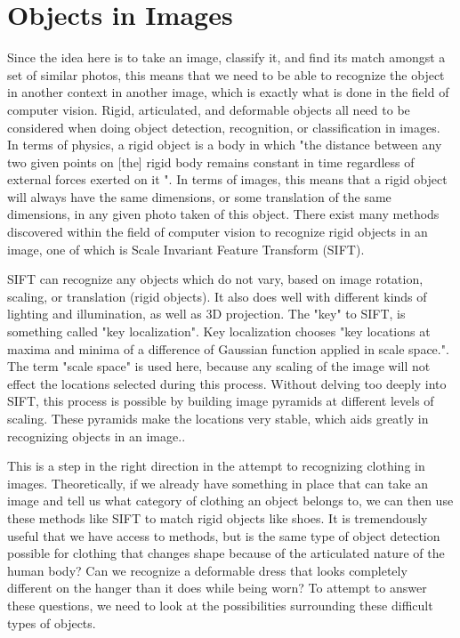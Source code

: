 \documentclass[12pt]{report} %
\begin{document}
\section{Objects in Images}

	Since the idea here is to take an image, classify it, and find its match amongst a set of similar photos, this means that we need to be able to recognize the object in another context in another image, which is exactly what is done in the field of computer vision. Rigid, articulated, and deformable objects all need to be considered when doing object detection, recognition, or classification in images. In terms of physics, a rigid object is a body in which "the distance between any two given points on [the] rigid body remains constant in time regardless of external forces exerted on it "\cite{RigidBodyWiki}. In terms of images, this means that a rigid object will always have the same dimensions, or some translation of the same dimensions, in any given photo taken of this object. There exist many methods discovered within the field of computer vision to recognize rigid objects in an image, one of which is Scale Invariant Feature Transform (SIFT)\cite{lowe1999object}. 
	
	SIFT can recognize any objects which do not vary, based on image rotation, scaling, or translation (rigid objects). It also does well with different kinds of lighting and illumination, as well as 3D projection\cite{lowe1999object}. The "key" to SIFT, is something called "key localization". Key localization chooses "key locations at maxima and minima of a difference of Gaussian function applied in scale space."\cite{lowe1999object}. The term "scale space" is used here, because any scaling of the image will not effect the locations selected during this process. Without delving too deeply into SIFT, this process is possible by building image pyramids at different levels of scaling. These pyramids make the locations very stable, which aids greatly in recognizing objects in an image.\cite{lowe1999object}.

	This is a step in the right direction in the attempt to recognizing clothing in images. Theoretically, if we already have something in place that can take an image and tell us what category of clothing an object belongs to, we can then use these methods like SIFT to match rigid objects like shoes. It is tremendously useful that we have access to methods, but is the same type of object detection possible for clothing that changes shape because of the articulated nature of the human body? Can we recognize a deformable dress that looks completely different on the hanger than it does while being worn? To attempt to answer these questions, we need to look at the possibilities surrounding these difficult types of objects. 
	
\end{document}
